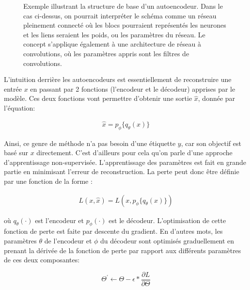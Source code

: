 \begin{figure}[h]
	\caption{Exemple illustrant la structure de base d'un autoencodeur. Dans le cas ci-dessus, on pourrait interpréter le schéma comme un réseau pleinement connecté où les blocs pourraient représentés les neurones et les liens seraient les poids, ou les paramètres du réseau. Le concept s'applique également à une architecture de réseau à convolutions, où les paramètres appris sont les filtres de convolutions.}
	\label{fig:basicAE}
\end{figure}

L'intuition derrière les autoencodeurs est essentiellement de reconstruire une entrée $x$ en passant par 2  fonctions (l'encodeur et le décodeur) apprises par le modèle. Ces deux fonctions vont permettre d'obtenir une sortie $\hat{x}$, donnée par l'équation:

\begin{gather} \label{eq:output}
	\hat{x} = p_\phi{\{q_\theta(x)\}}
\end{gather}

 Ainsi, ce genre de méthode n'a pas besoin d'une étiquette $y$, car son objectif est basé sur $x$ directement. C'est d'ailleurs pour cela qu'on parle d'une approche d'apprentissage non-supervisée. L'apprentissage des paramètres est fait en grande partie en minimisant l'erreur de reconstruction. La perte peut donc être définie par une fonction de la forme :

\begin{gather}  \label{eq:loss}
L(x, \hat{x}) = L(x, p_\phi{\{q_\theta(x)\}})
\end{gather}


\noindent où $q_{\theta}(\cdot)$ est l'encodeur et $p_{\phi}(\cdot)$ est le décodeur. L'optimisation de cette fonction de perte est faite par descente du gradient. En d'autres mots, les paramètres $\theta$ de l'encodeur et $\phi$ du décodeur sont optimisés graduellement en prenant la dérivée de la fonction de perte par rapport aux différents paramètres de ces deux composantes:


\begin{equation} \label{optim}
\Theta^{'} \leftarrow \Theta-\epsilon*\frac{\partial L}{\partial\Theta}
\end{equation}

